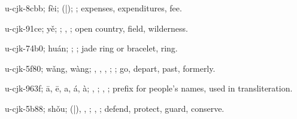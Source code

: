 \begin{multicols}{2}
{\cjkgGlue{}u-cjk-8cbb; fèi; \cjkgGlue{}\cjkgGlue{}(\cjkgGlue{}|\cjkgGlue{}); \cjkgGlue{}; expenses, expenditures, fee.

\cjkgGlue{}u-cjk-91ce; yě; \cjkgGlue{}; \cjkgGlue{}, \cjkgGlue{}; open country, field, wilderness.

\cjkgGlue{}u-cjk-74b0; huán; \cjkgGlue{}; \cjkgGlue{}; jade ring or bracelet, ring.

\cjkgGlue{}u-cjk-5f80; wǎng, wàng; \cjkgGlue{}\cjkgGlue{}\cjkgGlue{}, \cjkgGlue{}, \cjkgGlue{}\cjkgGlue{}\cjkgGlue{}, \cjkgGlue{}\cjkgGlue{}\cjkgGlue{}; \cjkgGlue{}; go, depart, past, formerly.

\cjkgGlue{}u-cjk-963f; ā, ē, a, á, à; \cjkgGlue{}\cjkgGlue{}\cjkgGlue{}, \cjkgGlue{}; \cjkgGlue{}, \cjkgGlue{}; prefix for people's names, used in transliteration.

\cjkgGlue{}u-cjk-5b88; shǒu; \cjkgGlue{}\cjkgGlue{}(\cjkgGlue{}|\cjkgGlue{}), \cjkgGlue{}, \cjkgGlue{}; \cjkgGlue{}, \cjkgGlue{}; defend, protect, guard, conserve.

}
\end{multicols}
